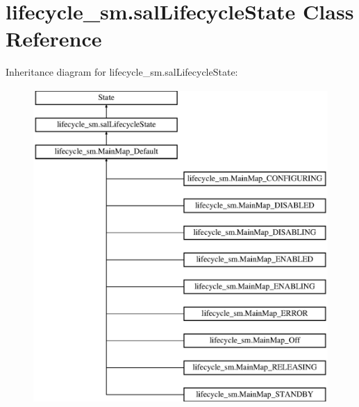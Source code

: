 \hypertarget{classlifecycle__sm_1_1sal_lifecycle_state}{\section{lifecycle\-\_\-sm.\-sal\-Lifecycle\-State Class Reference}
\label{classlifecycle__sm_1_1sal_lifecycle_state}
}
Inheritance diagram for lifecycle\-\_\-sm.\-sal\-Lifecycle\-State\-:\begin{figure}[H]
\begin{center}
\leavevmode
\includegraphics[height=12.000000cm]{classlifecycle__sm_1_1sal_lifecycle_state}
\end{center}
\end{figure}
